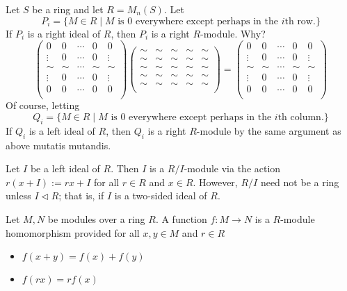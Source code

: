 \begin{ex}
Let $S$ be a ring and let $R=M_n(S)$. Let
	\[
	P_i=\{M \in R \;|\; M \text{ is 0 everywhere except perhaps in the }i\text{th row.}\}
	\]
If $P_i$ is a right ideal of $R$, then $P_i$ is a right $R$-module. Why?
	\[
	\begin{pmatrix}
	0 & 0 & \cdots & 0 & 0 \\
	\vdots & 0 & \cdots & 0 & \vdots \\
	\sim & \sim & \cdots & \sim & \sim \\
	\vdots & 0 & \cdots & 0 & \vdots \\
	0 & 0 & \cdots & 0 & 0 \\
	\end{pmatrix}
	\begin{pmatrix}
	\sim & \sim & \sim & \sim & \sim \\
	\sim & \sim & \sim & \sim & \sim \\
	\sim & \sim & \sim & \sim & \sim \\
	\sim & \sim & \sim & \sim & \sim \\
	\sim & \sim & \sim & \sim & \sim \\
	\end{pmatrix}=
	\begin{pmatrix}
	0 & 0 & \cdots & 0 & 0 \\
	\vdots & 0 & \cdots & 0 & \vdots \\
	\sim & \sim & \cdots & \sim & \sim \\
	\vdots & 0 & \cdots & 0 & \vdots \\
	0 & 0 & \cdots & 0 & 0 \\
	\end{pmatrix}
	\]
Of course, letting
	\[
	Q_i=\{M \in R \;|\; M \text{ is 0 everywhere except perhaps in the }i\text{th column.}\}
	\]
If $Q_i$ is a left ideal of $R$, then $Q_i$ is a right $R$-module by the same argument as above mutatis mutandis. \xqed
\end{ex}


\begin{ex}
Let $I$ be a left ideal of $R$. Then $I$ is a $R/I$-module via the action $r(x+I):=rx+I$ for all $r \in R$ and $x \in R$. However, $R/I$ need not be a ring unless $I \lhd R$; that is, if $I$ is a two-sided ideal of $R$. \xqed
\end{ex}


\begin{dfn}
Let $M,N$ be modules over a ring $R$. A function $f: M \rightarrow N$ is a $R$-module homomorphism provided for all $x,y \in M$ and $r \in R$
	\begin{itemize}
	\item $f(x+y)=f(x)+f(y)$
	\item $f(rx)=rf(x)$
	\end{itemize}
\end{dfn}


